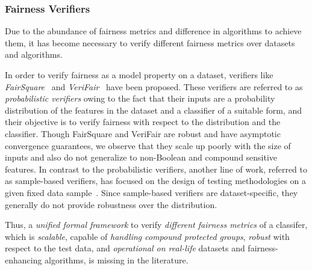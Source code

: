 \subsubsection{Fairness Verifiers} Due to the abundance of fairness metrics and difference in algorithms to achieve them, it has become necessary to verify different fairness metrics over datasets and algorithms. 

In order to verify fairness as a model property on a dataset, verifiers like \textit{FairSquare}~\cite{albarghouthi2017fairsquare} and \textit{VeriFair}~\cite{bastani2019probabilistic} have been proposed. 
These verifiers are referred to as {\em probabilistic verifiers} owing to the fact that their inputs are a probability  distribution of the features in the dataset and a classifier of a suitable form, and their objective is to verify fairness with respect to the distribution and the classifier.
Though FairSquare and VeriFair are robust and have asymptotic convergence guarantees, we observe that they scale up poorly with the size of inputs and also do not generalize to non-Boolean and compound sensitive features.
In contrast to the probabilistic verifiers, another line of work, referred to as sample-based verifiers, has focused on the design of testing methodologies  on a given fixed data sample~\cite{galhotra2017fairness,aif360-oct-2018}. 
Since sample-based verifiers are dataset-specific, they generally do not provide robustness over the distribution.


Thus, a \textit{unified formal framework} to verify \textit{different fairness metrics} of a classifer, which is \textit{scalable}, capable of \textit{handling compound protected groups}, \textit{robust} with respect to the test data, and \textit{operational on real-life} datasets and fairness-enhancing algorithms, is missing in the literature.

